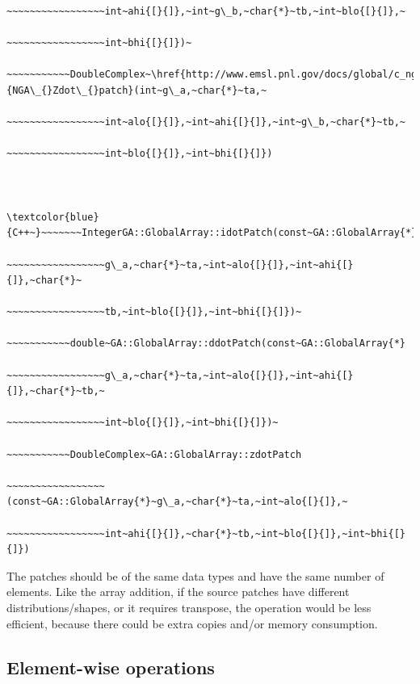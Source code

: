 \begin{verbatim}
~~~~~~~~~~~~~~~~~int~ahi{[}{]},~int~g\_b,~char{*}~tb,~int~blo{[}{]},~

~~~~~~~~~~~~~~~~~int~bhi{[}{]})~

~~~~~~~~~~~DoubleComplex~\href{http://www.emsl.pnl.gov/docs/global/c_nga_ops.html\#ga_dot_patch}{NGA\_{}Zdot\_{}patch}(int~g\_a,~char{*}~ta,~

~~~~~~~~~~~~~~~~~int~alo{[}{]},~int~ahi{[}{]},~int~g\_b,~char{*}~tb,~

~~~~~~~~~~~~~~~~~int~blo{[}{]},~int~bhi{[}{]})



\textcolor{blue}{C++~}~~~~~~~IntegerGA::GlobalArray::idotPatch(const~GA::GlobalArray{*}

~~~~~~~~~~~~~~~~~g\_a,~char{*}~ta,~int~alo{[}{]},~int~ahi{[}{]},~char{*}~

~~~~~~~~~~~~~~~~~tb,~int~blo{[}{]},~int~bhi{[}{]})~

~~~~~~~~~~~double~GA::GlobalArray::ddotPatch(const~GA::GlobalArray{*}

~~~~~~~~~~~~~~~~~g\_a,~char{*}~ta,~int~alo{[}{]},~int~ahi{[}{]},~char{*}~tb,~

~~~~~~~~~~~~~~~~~int~blo{[}{]},~int~bhi{[}{]})~

~~~~~~~~~~~DoubleComplex~GA::GlobalArray::zdotPatch

~~~~~~~~~~~~~~~~~(const~GA::GlobalArray{*}~g\_a,~char{*}~ta,~int~alo{[}{]},~

~~~~~~~~~~~~~~~~~int~ahi{[}{]},~char{*}~tb,~int~blo{[}{]},~int~bhi{[}{]})
\end{verbatim}
The patches should be of the same data types and have the same number
of elements. Like the array addition, if the source patches have different
distributions/shapes, or it requires transpose, the operation would
be less efficient, because there could be extra copies and/or memory
consumption. 


\subsection{Element-wise operations }

